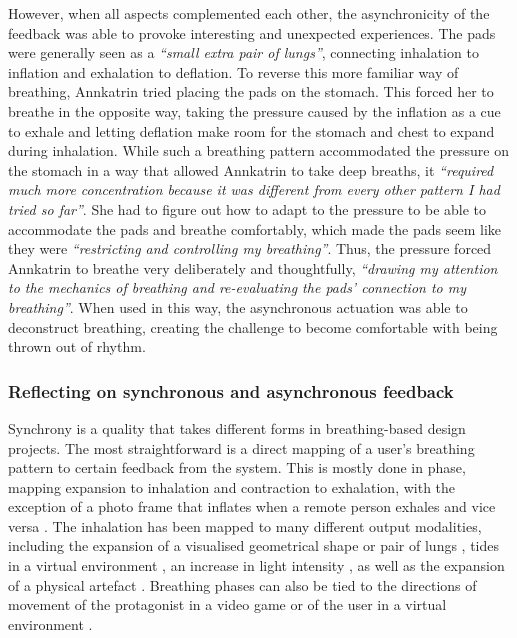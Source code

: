 However, when all aspects complemented each other, the asynchronicity of the feedback was able to provoke interesting and unexpected experiences. The pads were generally seen as a \textit{``small extra pair of lungs''}, connecting inhalation to inflation and exhalation to deflation. To reverse this more familiar way of breathing, Annkatrin tried placing the pads on the stomach. This forced her to breathe in the opposite way, taking the pressure caused by the inflation as a cue to exhale and letting deflation make room for the stomach and chest to expand during inhalation. While such a breathing pattern accommodated the pressure on the stomach in a way that allowed Annkatrin to take deep breaths, it \textit{``required much more concentration because it was different from every other pattern I had tried so far''}. She had to figure out how to adapt to the pressure to be able to accommodate the pads and breathe comfortably, which made the pads seem like they were \textit{``restricting and controlling my breathing''}. Thus, the pressure forced Annkatrin to breathe very deliberately and thoughtfully, \textit{``drawing my attention to the mechanics of breathing and re-evaluating the pads’ connection to my breathing''}. When used in this way, the asynchronous actuation was able to deconstruct breathing, creating the challenge to become comfortable with being thrown out of rhythm.


\subsubsection*{Reflecting on synchronous and asynchronous feedback}

Synchrony is a quality that takes different forms in breathing-based design projects. The most straightforward is a direct mapping of a user's breathing pattern to certain feedback from the system. This is mostly done in phase, mapping expansion to inhalation and contraction to exhalation, with the exception of a photo frame that inflates when a remote person exhales and vice versa \cite{kim_breathingframe_2015}. The inhalation has been mapped to many different output modalities, including the expansion of a visualised geometrical shape \cite{van_rooij_deep_2016, prpa_hacking_2016, wongsuphasawat_you_2012} or pair of lungs \cite{abushakra_augmenting_2014}, tides in a virtual environment \cite{roo_inner_2017}, an increase in light intensity \cite{dijk_breathe_2011, stahl_soma_2016}, as well as the expansion of a physical artefact \cite{aslan_hold_2016, kim_breathingframe_2015, sun_breath_2017, moran_exopranayama_2016, sjoman_breathing_2018}. Breathing phases can also be tied to the directions of movement of the protagonist in a video game \cite{sonne_chillfish_2016} or of the user in a virtual environment \cite{van_rooij_deep_2016, davies_osmose_1996, prpa_hacking_2016}.

